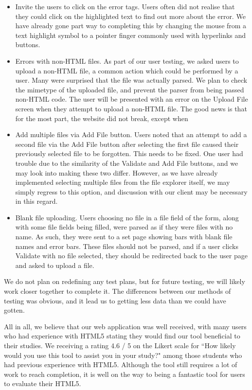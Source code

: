 \documentclass[10pt]{article}
\begin{document}
\begin{itemize}
\item Invite the users to click on the error tags. Users often did not realise that they could click on the highlighted text to find out more about the error. We have already gone part way to completing this by changing the mouse from a text highlight symbol to a pointer finger commonly used with hyperlinks and buttons.
\item Errors with non-HTML files. As part of our user testing, we asked users to upload a non-HTML file, a common action which could be performed by a user. Many were surprised that the file was actually parsed. We plan to check the mimetype of the uploaded file, and prevent the parser from being passed non-HTML code. The user will be presented with an error on the Upload File screen when they attempt to upload a non-HTML file. The good news is that for the most part, the website did not break, except when 
\item Add multiple files via Add File button. Users noted that an attempt to add a second file via the Add File button after selecting the first file caused their previously selected file to be forgotten. This needs to be fixed. One user had trouble due to the similarity of the Validate and Add File buttons, and we may look into making these two differ. However, as we have already implemented selecting multiple files from the file explorer itself, we may simply regress to this option, and discussion with our client may be necessary in this regard.
\item Blank file uploading. Users choosing no file in a file field of the form, along with some file fields being filled, were parsed as if they were files with no name. As such, they were sent to a set page showing bars with blank file names and error bars. These files should not be parsed, and if a user clicks Validate with no file selected, they should be redirected back to the user page and asked to upload a file.
\end{itemize}

We do not plan on redefining any test plans, but for future testing, we will likely work closer together to complete it. The differences between our methods of testing was obvious, and it lead us to getting less data than we could have gotten.

All in all, we believe that our web application was well received, with many users who had experience with HTML5 stating they would find our tool beneficial to their studies. We receiving a rating 4.6 / 5 on the Likert scale for ``How likely would you use this tool to assist you in your study?" among those students who had previous experience with HTML5. Although the tool still requires a lot of work to reach completion, it is well on the way to being a fantastic tool for users to evaluate their HTML5.
\end{document}
